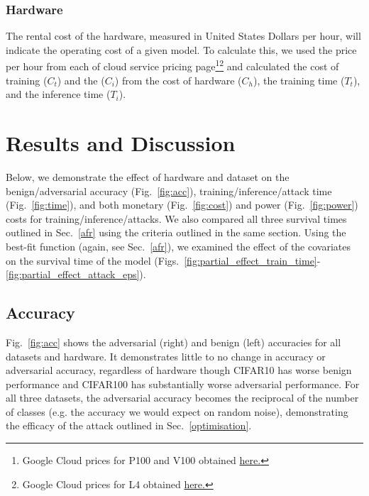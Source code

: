 \documentclass[conference]{IEEEtran}
\begin{document}
\subsubsection{Hardware}
The rental cost of the hardware, measured in United States Dollars per hour, will indicate the operating cost of a given model. To calculate this, we used the price per hour from each of cloud service pricing page\footnote{Google Cloud prices for P100 and V100 obtained \href{https://cloud.google.com/compute/gpus-pricing}{here.}}\footnote{Google Cloud prices for L4 obtained  \href{https://cloud.google.com/compute/vm-instance-pricing\#accelerator-optimized}{here.}} and calculated the cost of training ($C_{t}$) and the ($C_{i}$) from the cost of hardware ($C_{h}$), the training time ($T_{t}$), and the inference time ($T_{i}$).





\section{Results and Discussion}
\label{results}

Below, we demonstrate the effect of hardware and dataset on the benign/adversarial accuracy (Fig.~\ref{fig:acc}), training/inference/attack time (Fig.~\ref{fig:time}), and both monetary (Fig.~\ref{fig:cost}) and power (Fig.~\ref{fig:power}) costs for training/inference/attacks. We also compared all three survival times outlined in Sec.~\ref{afr} using the criteria outlined in the same section. Using the best-fit function (again, see Sec.~\ref{afr}), we examined the effect of the covariates on the survival time of the model (Figs.~\ref{fig:partial_effect_train_time}-\ref{fig:partial_effect_attack_eps}).

\subsection{Accuracy}
Fig.~\ref{fig:acc} shows the adversarial (right) and benign (left) accuracies for all datasets and hardware. It demonstrates little to no change in accuracy or adversarial accuracy, regardless of hardware though CIFAR10 has worse benign performance and CIFAR100 has substantially worse adversarial performance. For all three datasets, the adversarial accuracy becomes the reciprocal of the number of classes (e.g. the accuracy we would expect on random noise), demonstrating the efficacy of the attack outlined in Sec.~\ref{optimisation}.
\end{document}
